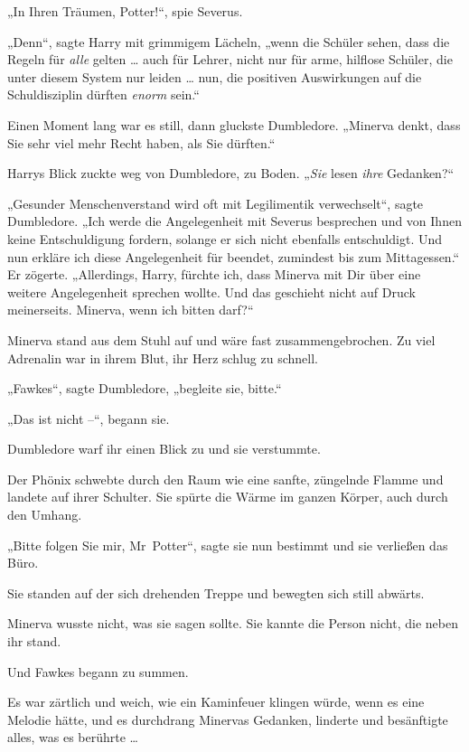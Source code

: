 „In Ihren Träumen, Potter!“, spie Severus. 

„Denn“, sagte Harry mit grimmigem Lächeln, „wenn die Schüler sehen, dass die Regeln für \emph{alle} gelten … auch für Lehrer, nicht nur für arme, hilflose Schüler, die unter diesem System nur leiden … nun, die positiven Auswirkungen auf die Schuldisziplin dürften \emph{enorm} sein.“ 

Einen Moment lang war es still, dann gluckste Dumbledore. „Minerva denkt, dass Sie sehr viel mehr Recht haben, als Sie dürften.“ 

Harrys Blick zuckte weg von Dumbledore, zu Boden. „\emph{Sie} lesen \emph{ihre} Gedanken?“ 

„Gesunder Menschenverstand wird oft mit Legilimentik verwechselt“, sagte Dumbledore. „Ich werde die Angelegenheit mit Severus besprechen und von Ihnen keine Entschuldigung fordern, solange er sich nicht ebenfalls entschuldigt. Und nun erkläre ich diese Angelegenheit für beendet, zumindest bis zum Mittagessen.“ Er zögerte. „Allerdings, Harry, fürchte ich, dass Minerva mit Dir über eine weitere Angelegenheit sprechen wollte. Und das geschieht nicht auf Druck meinerseits. Minerva, wenn ich bitten darf?“ 

Minerva stand aus dem Stuhl auf und wäre fast zusammengebrochen. Zu viel Adrenalin war in ihrem Blut, ihr Herz schlug zu schnell. 

„Fawkes“, sagte Dumbledore, „begleite sie, bitte.“ 

„Das ist nicht –“, begann sie. 

Dumbledore warf ihr einen Blick zu und sie verstummte. 

Der Phönix schwebte durch den Raum wie eine sanfte, züngelnde Flamme und landete auf ihrer Schulter. Sie spürte die Wärme im ganzen Körper, auch durch den Umhang. 

„Bitte folgen Sie mir, Mr~Potter“, sagte sie nun bestimmt und sie verließen das Büro. 

\later 

Sie standen auf der sich drehenden Treppe und bewegten sich still abwärts. 

Minerva wusste nicht, was sie sagen sollte. Sie kannte die Person nicht, die neben ihr stand. 

Und Fawkes begann zu summen. 

Es war zärtlich und weich, wie ein Kaminfeuer klingen würde, wenn es eine Melodie hätte, und es durchdrang Minervas Gedanken, linderte und besänftigte alles, was es berührte … 

